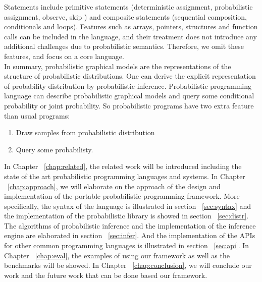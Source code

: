 Statements include primitive statements (deterministic assignment, probabilistic assignment, observe, skip ) and composite statements (sequential composition, conditionals and loops). Features such as arrays, pointers, structures and function calls can be included in the language, and their treatment does not introduce any additional challenges due to probabilistic semantics. Therefore, we omit these features, and focus on a core language.\\

In summary, probabilistic graphical models are the representations of the structure of probabilistic distributions. One can derive the explicit representation of probability distribution by probabilistic inference. Probabilistic programming language can describe probabilistic graphical models and query some conditional probability or joint probability. So probabilistic programs have two extra feature than usual programs: 
\begin{enumerate}
  \item Draw samples from probabilistic distribution
  \item Query some probabilisty.
\end{enumerate}

In Chapter ~\ref{chap:related}, the related work will be introduced including the state of the art probabilistic programming languages and systems. In Chapter ~\ref{chap:approach}, we will elaborate on the approach of the design and implementation of the portable probabilistic programming framework. More specifically, the syntax of the language is illustrated in section ~\ref{sec:syntax} and the implementation of the probabilistic library is showed in section ~\ref{sec:distr}. The algorithms of probabilistic inference and the implementation of the inference engine are elaborated in section ~\ref{sec:infer}. And the implementation of the APIs for other common programming languages is illustrated in section ~\ref{sec:api}. In Chapter ~\ref{chap:eval}, the examples of using our framework as well as the benchmarks will be showed. In Chapter ~\ref{chap:conclusion}, we will conclude our work and the future work that can be done based our framework. 

